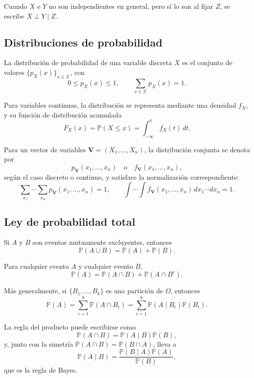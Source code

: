 \documentclass[12pt]{report} %
\begin{document}
Cuando $X$ e $Y$ no son independientes en general, pero sí lo son al fijar $Z$, se escribe $X \perp Y \mid Z$.

\subsection{Distribuciones de probabilidad}

La distribución de probabilidad de una variable discreta $X$ es el conjunto de valores $\{p_X(x)\}_{x\in\mathcal{X}}$, con
$$
    0\leq p_X(x)\leq 1,
    \qquad
    \sum_{x\in\mathcal{X}} p_X(x)=1.
$$

Para variables continuas, la distribución se representa mediante una densidad $f_X$, y su función de distribución acumulada
$$
    F_X(x)=\mathbb{P}(X\leq x)=\int_{-\infty}^{x} f_X(t)\,dt.
$$

Para un vector de variables $\mathbf{V}=(X_1,\dots,X_n)$, la distribución conjunta se denota por
$$
    p_{\mathbf{V}}(x_1,\dots,x_n)
    \quad\text{o}\quad
    f_{\mathbf{V}}(x_1,\dots,x_n),
$$
según el caso discreto o continuo, y satisface la normalización correspondiente:
$$
    \sum_{x_1}\cdots\sum_{x_n} p_{\mathbf{V}}(x_1,\dots,x_n)=1,
    \qquad
    \int\cdots\int f_{\mathbf{V}}(x_1,\dots,x_n)\,dx_1\cdots dx_n=1.
$$

\subsection{Ley de probabilidad total}

Si $A$ y $B$ son eventos mutuamente excluyentes, entonces
\begin{equation}
    \mathbb{P}(A\cup B)=\mathbb{P}(A)+\mathbb{P}(B).
    \label{eq:sum_rule_disjoint_events}
\end{equation}

Para cualquier evento $A$ y cualquier evento $B$,
\begin{equation}
    \mathbb{P}(A)=\mathbb{P}(A\cap B)+\mathbb{P}(A\cap B^c).
    \label{eq:binary_partition_probability}
\end{equation}

Más generalmente, si $\{B_1,\dots,B_k\}$ es una partición de $\Omega$, entonces
\begin{equation}
    \mathbb{P}(A)=\sum_{i=1}^{k}\mathbb{P}(A\cap B_i)
    =\sum_{i=1}^{k}\mathbb{P}(A\mid B_i)\mathbb{P}(B_i).
    \label{eq:law_total_probability_partition}
\end{equation}

La regla del producto puede escribirse como
\begin{equation}
    \mathbb{P}(A\cap B)=\mathbb{P}(A\mid B)\mathbb{P}(B),
    \label{eq:product_rule_again}
\end{equation}
y, junto con la simetría $\mathbb{P}(A\cap B)=\mathbb{P}(B\cap A)$, lleva a
\begin{equation}
    \mathbb{P}(A\mid B)=\frac{\mathbb{P}(B\mid A)\mathbb{P}(A)}{\mathbb{P}(B)},
    \label{eq:bayes_rule_again}
\end{equation}
que es la regla de Bayes.
\end{document}
